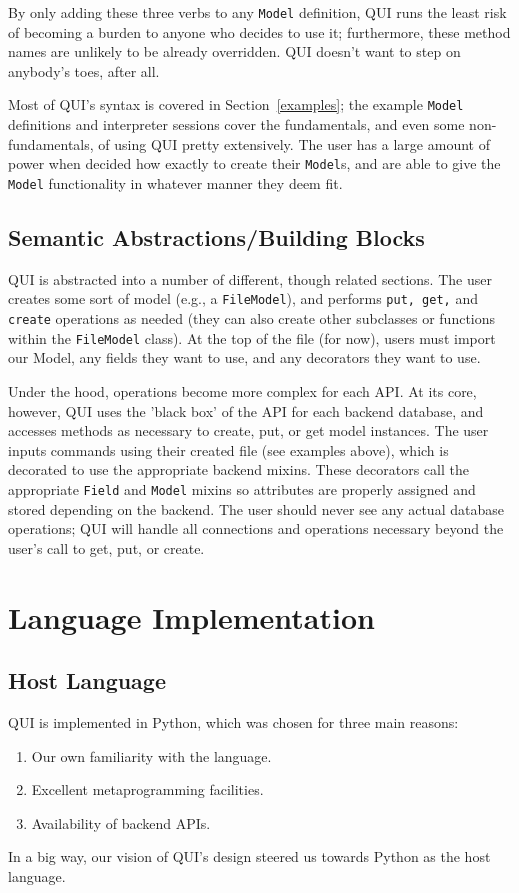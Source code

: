 \documentclass{article} %
\newcommand{\il}[1]{\mbox{\lstinline{#1}}}
\begin{document}
By only adding these three verbs to any \il{Model} definition, QUI runs the least risk of becoming a burden to anyone who decides to use
it; furthermore, these method names are unlikely to be already overridden. QUI doesn't want to step on anybody's toes, after all. 

Most of QUI's syntax is covered in Section~\ref{examples}; the example \il{Model} definitions and interpreter sessions cover the fundamentals,
and even some non-fundamentals, of using QUI pretty extensively. The user has a large amount of power when decided how exactly to create their
\il{Model}s, and are able to give the \il{Model} functionality in whatever manner they deem fit.

\subsection{Semantic Abstractions/Building Blocks}
QUI is abstracted into a number of different, though related sections. The user creates some sort of model (e.g., a \il{FileModel}), and performs \il{put, get,} and \il{create} operations as needed (they can also create other subclasses or functions within the \il{FileModel} class). At the top of the file (for now), users must import
our Model, any fields they want to use, and any decorators they want to use. 

Under the hood, operations become more complex for each API.  At its core, however, QUI uses the 'black box' of the API for each backend database, and accesses methods
as necessary to create, put, or get model instances. The user inputs commands using their created file (see examples above), which is decorated to use the appropriate backend mixins. 
These decorators call the appropriate \il{Field} and \il{Model} mixins so attributes are properly assigned and stored depending on the backend. The user should never see any actual 
database operations; QUI will handle all connections and operations necessary beyond the user's call to get, put, or create.

\newpage
\section{Language Implementation}
\subsection{Host Language}
QUI is implemented in Python, which was chosen for three main reasons:
\begin{enumerate}
\item Our own familiarity with the language.
\item Excellent metaprogramming facilities.
\item Availability of backend APIs.
\end{enumerate}
In a big way, our vision of QUI's design steered us towards Python as the host language. 
\end{document}
